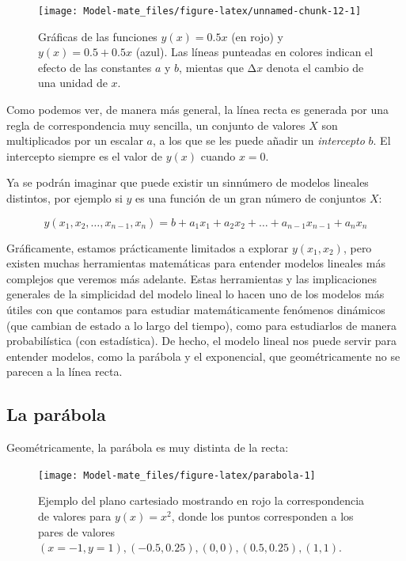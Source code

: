 \documentclass[
]{book}
\begin{document}
\begin{figure}

{\centering \texttt{[image: Model-mate\_files/figure-latex/unnamed-chunk-12-1]} 

}

\caption{Gráficas de las funciones $y(x) = 0.5 x$ (en rojo) y $y(x) = 0.5 + 0.5 x$ (azul). Las líneas punteadas en colores indican el efecto de las constantes $a$ y $b$, mientas que Δ$x$ denota el cambio de una unidad de $x$.}\label{fig:unnamed-chunk-12}
\end{figure}

Como podemos ver, de manera más general, la línea recta es generada por una regla de correspondencia muy sencilla, un conjunto de valores \(X\) son multiplicados por un escalar \(a\), a los que se les puede añadir un \emph{intercepto} \(b\). El intercepto siempre es el valor de \(y(x)\) cuando \(x = 0\).

Ya se podrán imaginar que puede existir un sinnúmero de modelos lineales distintos, por ejemplo si \(y\) es una función de un gran número de conjuntos \(X\):

\begin{equation}
y(x_1, x_2, \dots, x_{n-1}, x_n) = b + a_1 x_1 + a_2 x_2 + \dots + a_{n-1} x_{n-1} + a_n x_n
\end{equation}

Gráficamente, estamos prácticamente limitados a explorar \(y(x_1, x_2)\), pero existen muchas herramientas matemáticas para entender modelos lineales más complejos que veremos más adelante. Estas herramientas y las implicaciones generales de la simplicidad del modelo lineal lo hacen uno de los modelos más útiles con que contamos para estudiar matemáticamente fenómenos dinámicos (que cambian de estado a lo largo del tiempo), como para estudiarlos de manera probabilística (con estadística). De hecho, el modelo lineal nos puede servir para entender modelos, como la parábola y el exponencial, que geométricamente no se parecen a la línea recta.

\hypertarget{la-paruxe1bola}{%
\subsection{La parábola}\label{la-paruxe1bola}}

Geométricamente, la parábola es muy distinta de la recta:

\begin{figure}

{\centering \texttt{[image: Model-mate\_files/figure-latex/parabola-1]} 

}

\caption{Ejemplo del plano cartesiado mostrando en rojo la correspondencia de valores para $y(x) = x^2$, donde los puntos corresponden a los pares de valores $(x = -1, y = 1), (-0.5, 0.25), (0, 0), (0.5, 0.25), (1, 1)$.}\label{fig:parabola}
\end{figure}
\end{document}
